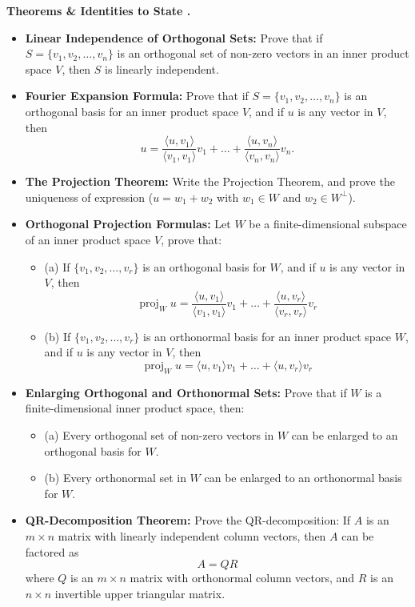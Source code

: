 \documentclass{../../../templates/natsirt}
\newcounter{topic}[section]
\newenvironment{theoremsbox}[1][]{%
    \begin{greenbox}[#1]\refstepcounter{topic}\textbf{Theorems \& Identities to State \thesection.\thetopic}%
}{\end{greenbox}}
\newcommand{\citem}{\item[$\square$]}
\DeclareMathOperator{\proj}{proj}
\begin{document}
\begin{theoremsbox}
    \begin{itemize}
        \citem \textbf{Linear Independence of Orthogonal Sets:} Prove that if $S = \{v_1, v_2, \dots, v_n\}$ is an orthogonal set of non-zero vectors in an inner product space $V$, then $S$ is linearly independent.
        \citem \textbf{Fourier Expansion Formula:} Prove that if $S = \{v_1, v_2, \dots, v_n\}$ is an orthogonal basis for an inner product space $V$, and if $u$ is any vector in $V$, then
        \[ u = \frac{\langle u, v_1 \rangle}{\langle v_1, v_1 \rangle} v_1 + \dots + \frac{\langle u, v_n \rangle}{\langle v_n, v_n \rangle} v_n. \]
        \citem \textbf{The Projection Theorem:} Write the Projection Theorem, and prove the uniqueness of expression ($u = w_1 + w_2$ with $w_1 \in W$ and $w_2 \in W^\perp$).
        \citem \textbf{Orthogonal Projection Formulas:} Let $W$ be a finite-dimensional subspace of an inner product space $V$, prove that:
        \begin{itemize}
            \citem (a) If $\{v_1, v_2, \dots, v_r\}$ is an orthogonal basis for $W$, and if $u$ is any vector in $V$, then
            \[ \proj_W u = \frac{\langle u, v_1 \rangle}{\langle v_1, v_1 \rangle} v_1 + \dots + \frac{\langle u, v_r \rangle}{\langle v_r, v_r \rangle} v_r \]
            \citem (b) If $\{v_1, v_2, \dots, v_r\}$ is an orthonormal basis for an inner product space $W$, and if $u$ is any vector in $V$, then
            \[ \proj_W u = \langle u, v_1 \rangle v_1 + \dots + \langle u, v_r \rangle v_r \]
        \end{itemize}
        \citem \textbf{Enlarging Orthogonal and Orthonormal Sets:} Prove that if $W$ is a finite-dimensional inner product space, then:
        \begin{itemize}
            \citem (a) Every orthogonal set of non-zero vectors in $W$ can be enlarged to an orthogonal basis for $W$.
            \citem (b) Every orthonormal set in $W$ can be enlarged to an orthonormal basis for $W$.
        \end{itemize}
        \citem \textbf{QR-Decomposition Theorem:} Prove the QR-decomposition: If $A$ is an $m \times n$ matrix with linearly independent column vectors, then $A$ can be factored as
        \[ A = QR \]
        where $Q$ is an $m \times n$ matrix with orthonormal column vectors, and $R$ is an $n \times n$ invertible upper triangular matrix.
    \end{itemize}
\end{theoremsbox}
\end{document}
